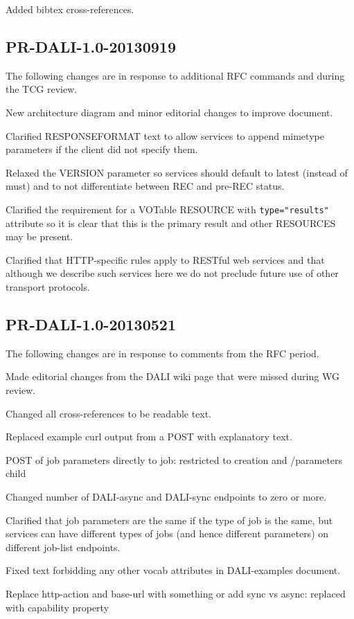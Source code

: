\documentclass[11pt,letter]{ivoa}
\begin{document}
Added bibtex cross-references.

\subsection{PR-DALI-1.0-20130919}
The following changes are in response to additional RFC commands and during the
TCG review.

New architecture diagram and minor editorial changes to improve document.

Clarified RESPONSEFORMAT text to allow services to append mimetype parameters if
the client did not specify them.

Relaxed the VERSION parameter so services should default to latest (instead of
must) and to not differentiate between REC and pre-REC status.

Clarified the requirement for a VOTable RESOURCE with \verb|type="results"| attribute
so it is clear that this is the primary result and other RESOURCES may be
present.

Clarified that HTTP-specific rules apply to RESTful web services and that
although we describe such services here we do not preclude future use of other
transport protocols.

\subsection{PR-DALI-1.0-20130521}
The following changes are in response to comments from the RFC period.

Made editorial changes from the DALI wiki page that were missed during WG
review.

Changed all cross-references to be readable text.

Replaced example curl output from a POST with explanatory text.

POST of job parameters directly to job: restricted to creation and /parameters
child

Changed number of DALI-async and DALI-sync endpoints to zero or more.

Clarified that job parameters are the same if the type of job is the same, but
services can have different types of jobs (and hence different parameters) on
different job-list endpoints.

Fixed text forbidding any other vocab attributes in DALI-examples document.

Replace http-action and base-url with something or add sync vs async: replaced
with capability property
\end{document}
